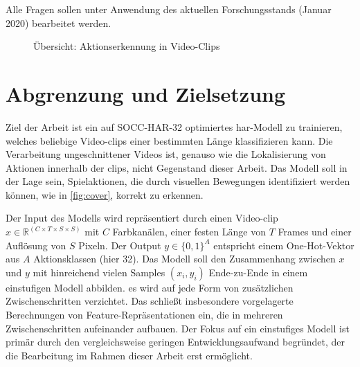 Alle Fragen sollen unter Anwendung des aktuellen Forschungsstands (Januar 2020) bearbeitet werden.

\begin{figure}[htbp]
    \centering


    \caption{Übersicht: Aktionserkennung in Video-Clips }
    \label{fig:cover}
\end{figure}

\section{Abgrenzung und Zielsetzung}
\label{sec:zielsetzung}

Ziel der Arbeit ist ein auf SOCC-HAR-32 optimiertes \gls{har}-Modell zu trainieren, welches beliebige Video-\glspl{clip} einer bestimmten Länge klassifizieren kann.
Die Verarbeitung ungeschnittener Videos ist, genauso wie die Lokalisierung von Aktionen innerhalb der \glspl{clip}, nicht Gegenstand dieser Arbeit.
Das Modell soll in der Lage sein, Spielaktionen, die durch visuellen Bewegungen identifiziert werden können, wie in \autoref{fig:cover}, korrekt zu erkennen.

Der Input des Modells wird repräsentiert durch einen Video-\gls{clip} $x \in \mathbb{R}^{(C \times T \times S \times S)}$ mit $C$ Farbkanälen, einer festen Länge von $T$ Frames und einer Auflösung von $S$ Pixeln.
Der Output $y \in \{0, 1\}^A$ entspricht einem One-Hot-Vektor aus $A$ Aktionsklassen (hier 32).
Das Modell soll den Zusammenhang zwischen $x$ und $y$ mit hinreichend vielen Samples $(x_i, y_i)$ Ende-zu-Ende in einem einstufigen Modell abbilden.
\Dh es wird auf jede Form von zusätzlichen Zwischenschritten verzichtet.
Das schließt insbesondere vorgelagerte Berechnungen von Feature-Repräsentationen ein, die in mehreren Zwischenschritten aufeinander aufbauen.
Der Fokus auf ein einstufiges Modell ist primär durch den vergleichsweise geringen Entwicklungsaufwand begründet, der die Bearbeitung im Rahmen dieser Arbeit erst ermöglicht.

